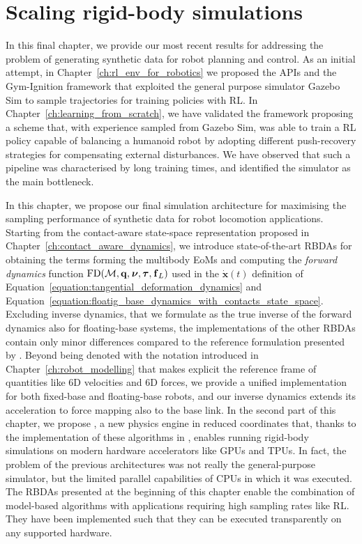 \chapter{Scaling rigid-body simulations}
\label{ch:scaling_rigid_body_simulations}

In this final chapter, we provide our most recent results for addressing the problem of generating synthetic data for robot planning and control.
As an initial attempt, in Chapter~\ref{ch:rl_env_for_robotics} we proposed the \scenario \acp{API} and the Gym-Ignition framework that exploited the general purpose simulator Gazebo Sim to sample trajectories for training policies with \ac{RL}.
In Chapter~\ref{ch:learning_from_scratch}, we have validated the framework proposing a scheme that, with experience sampled from Gazebo Sim, was able to train a \ac{RL} policy capable of balancing a humanoid robot by adopting different push-recovery strategies for compensating external disturbances.
We have observed that such a pipeline was characterised by long training times, and identified the simulator as the main bottleneck.

In this chapter, we propose our final simulation architecture for maximising the sampling performance of synthetic data for robot locomotion applications.
Starting from the contact-aware state-space representation proposed in Chapter~\ref{ch:contact_aware_dynamics}, we introduce state-of-the-art \acp{RBDA} for obtaining the terms forming the multibody \acp{EoM} and computing the \emph{forward dynamics} function $\operatorname{FD}(\mathcal{M}, \mathbf{q}, \prescript{}{}{\boldsymbol{\nu}}, \boldsymbol{\tau}, \prescript{}{}{\mathbf{f}}_L)$ used in the  $\dot{\mathbf{x}}(t)$ definition of Equation~\ref{equation:tangential_deformation_dynamics} and Equation~\ref{equation:floatig_base_dynamics_with_contacts_state_space}.
Excluding inverse dynamics, that we formulate as the true inverse of the forward dynamics also for floating-base systems, the implementations of the other \acp{RBDA} contain only minor differences compared to the reference formulation presented by \textcite{featherstone_rigid_2008}.
Beyond being denoted with the notation introduced in Chapter~\ref{ch:robot_modelling} that makes explicit the reference frame of quantities like 6D velocities and 6D forces, we provide a unified implementation for both fixed-base and floating-base robots, and our inverse dynamics extends its acceleration to force mapping also to the base link.
In the second part of this chapter, we propose  \jaxsim, a new physics engine in reduced coordinates that, thanks to the implementation of these algorithms in \jax, enables running rigid-body simulations on modern hardware accelerators like \acsp{GPU} and \acsp{TPU}.
In fact, the problem of the previous architectures was not really the general-purpose simulator, but the limited parallel capabilities of \acsp{CPU} in which it was executed.
The \acp{RBDA} presented at the beginning of this chapter enable the combination of model-based algorithms with applications requiring high sampling rates like \acs{RL}.
They have been implemented such that they can be executed transparently on any supported hardware.

